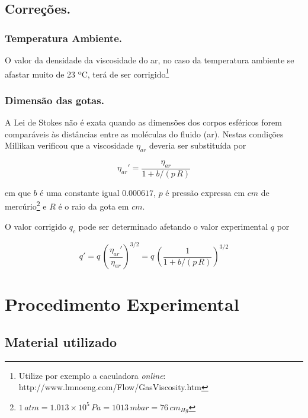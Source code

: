 \documentclass[a4paper,twoside,12pt]{article}      %
\begin{document}
\subsection{\sf Correções.}
\subsubsection{\sf Temperatura Ambiente.}

O valor da densidade da viscosidade do ar, no caso da temperatura ambiente se afastar muito de 23 ºC, terá de ser corrigido\footnote{Utilize por exemplo a caculadora \emph{online}: http://www.lmnoeng.com/Flow/GasViscosity.htm}

\subsubsection{\sf Dimensão das gotas.}

A Lei de Stokes não é exata quando as dimensões dos corpos esféricos forem comparáveis às distâncias entre as moléculas do fluido (ar).
Nestas condições Millikan verificou que a viscosidade $\eta_{ar}$ deveria ser substituída por

\begin{equation}
	\label{eq:correcao}
	\eta_{ar}' = \frac{\eta_{ar}}{1 + b/(p\,R)}  
\end{equation}

em que $b$ é uma constante igual $0.000617$, $p$ é pressão expressa em $cm$ de mercúrio\footnote{$1\,atm  = 1.013 \times 10^5 \,Pa = 1013 \, mbar = 76\, cm_{Hg}$}  e $R$ é o raio da gota em $cm$.

O valor corrigido $q_c$ pode ser determinado afetando o valor experimental $q$ por

\begin{equation}
	\label{eq:correcao1}
	q ' = q\, \left(\frac{\eta_{ar}'}{\eta_{ar}}\right)^{3/2}  =q\, \left(\frac{1}{1 + b/(p\,R)}\right)^{3/2}  
\end{equation}

\newpage
\section{\sf Procedimento Experimental}



\subsection{\sf Material utilizado}
\end{document}
